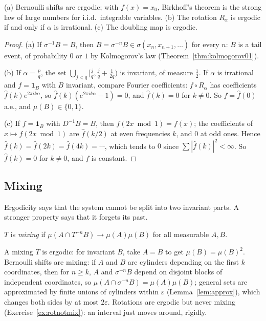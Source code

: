 \begin{corollary}\label{cor:ergexamples}
(a) Bernoulli shifts are ergodic; with $f(x)=x_0$, Birkhoff's theorem is the strong law of large numbers for i.i.d.\ integrable variables.
(b) The rotation $R_\alpha$ is ergodic if and only if $\alpha$ is irrational.
(c) The doubling map is ergodic.
\end{corollary}
\begin{proof}
(a) If $\sigma^{-1}B=B$, then $B=\sigma^{-n}B\in\sigma(x_n,x_{n+1},\dots)$ for every $n$: $B$ is a tail event, of probability $0$ or $1$ by Kolmogorov's law (Theorem~\ref{thm:kolmogorov01}).

(b) If $\alpha=\frac pq$, the set $\bigcup_{j<q}[\frac jq,\frac jq+\frac1{2q})$ is invariant, of measure $\frac12$. If $\alpha$ is irrational and $f=\mathbf 1_B$ with $B$ invariant, compare Fourier coefficients: $f\circ R_\alpha$ has
coefficients $\hat f(k)e^{2\pi ik\alpha}$, so $\hat f(k)(e^{2\pi ik\alpha}-1)=0$, and $\hat f(k)=0$ for $k\neq0$. So $f=\hat f(0)$ a.e., and $\mu(B)\in\{0,1\}$.

(c) If $f=\mathbf 1_B$ with $D^{-1}B=B$, then $f(2x\bmod1)=f(x)$; the coefficients of $x\mapsto f(2x\bmod1)$ are $\hat f(k/2)$ at even frequencies $k$, and $0$ at odd ones. Hence $\hat f(k)=\hat f(2k)=\hat f(4k)=\cdots$, which tends to $0$
since $\sum|\hat f(k)|^2<\infty$. So $\hat f(k)=0$ for $k\neq0$, and $f$ is constant.
\end{proof}

\subsection*{Mixing}

Ergodicity says that the system cannot be split into two invariant parts. A stronger property says that it forgets its past.

\begin{definition}
$T$ is \emph{mixing} if $\mu(A\cap T^{-n}B)\to\mu(A)\mu(B)$ for all measurable $A,B$.
\end{definition}

A mixing $T$ is ergodic: for invariant $B$, take $A=B$ to get $\mu(B)=\mu(B)^2$. Bernoulli shifts are mixing: if $A$ and $B$ are cylinders depending on the first $k$ coordinates, then for $n\ge k$, $A$ and
$\sigma^{-n}B$ depend on disjoint blocks of independent coordinates, so $\mu(A\cap\sigma^{-n}B)=\mu(A)\mu(B)$; general sets are approximated by finite unions of cylinders within $\varepsilon$ (Lemma~\ref{lem:approx}), which
changes both sides by at most $2\varepsilon$. Rotations are ergodic but never mixing (Exercise~\ref{ex:rotnotmix}): an interval just moves around, rigidly.

